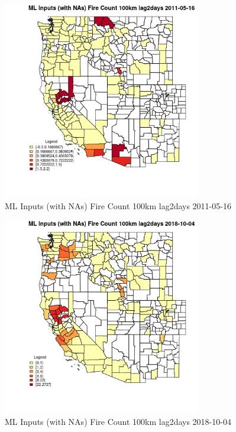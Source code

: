 \begin{figure} 
\centering  
\includegraphics[width=0.77\textwidth]{Code_Outputs/Report_ML_input_PM25_Step4_part_f_de_duplicated_aves_prioritize_24hr_obswNAs_CountyFire_Count_100km_lag2daysMean2011-05-16.jpg} 
\caption{\label{fig:Report_ML_input_PM25_Step4_part_f_de_duplicated_aves_prioritize_24hr_obswNAsCountyFire_Count_100km_lag2daysMean2011-05-16}ML Inputs (with NAs) Fire Count 100km lag2days 2011-05-16} 
\end{figure} 
 

\begin{figure} 
\centering  
\includegraphics[width=0.77\textwidth]{Code_Outputs/Report_ML_input_PM25_Step4_part_f_de_duplicated_aves_prioritize_24hr_obswNAs_CountyFire_Count_100km_lag2daysMean2018-10-04.jpg} 
\caption{\label{fig:Report_ML_input_PM25_Step4_part_f_de_duplicated_aves_prioritize_24hr_obswNAsCountyFire_Count_100km_lag2daysMean2018-10-04}ML Inputs (with NAs) Fire Count 100km lag2days 2018-10-04} 
\end{figure} 
 


